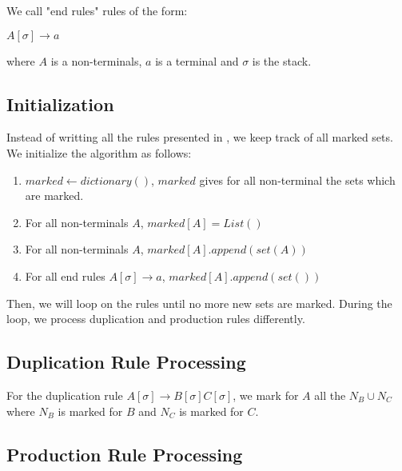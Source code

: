 \documentclass[10pt,a4paper,draft]{article}
\begin{document}
\begin{definition}
We call "end rules" rules of the form:

$A[\sigma] \rightarrow a$

where $A$ is a non-terminals, $a$ is a terminal and $\sigma$ is the stack.
\end{definition}

\subsection{Initialization}
\label{initAlgo}

Instead of writting all the rules presented in \cite{aho68}, we keep track of all marked sets. We initialize the algorithm as follows:

\begin{enumerate}
\item $marked \leftarrow dictionary()$, $marked$ gives for all non-terminal the sets which are marked.
\item For all non-terminals $A$, $marked[A] = List()$
\item For all non-terminals $A$, $marked[A].append(set(A))$
\item For all end rules $A[\sigma] \rightarrow a$, $marked[A].append(set())$ 
\end{enumerate}

Then, we will loop on the rules until no more new sets are marked. During the loop, we process duplication and production rules differently.

\subsection{Duplication Rule Processing}
\label{processDuplication}

For the duplication rule $A[\sigma] \rightarrow B[\sigma] C[\sigma]$, we mark for $A$ all the $N_B \cup N_C$ where $N_B$ is marked for $B$ and $N_C$ is marked for $C$.

\subsection{Production Rule Processing}
\label{processProduction}
\end{document}
